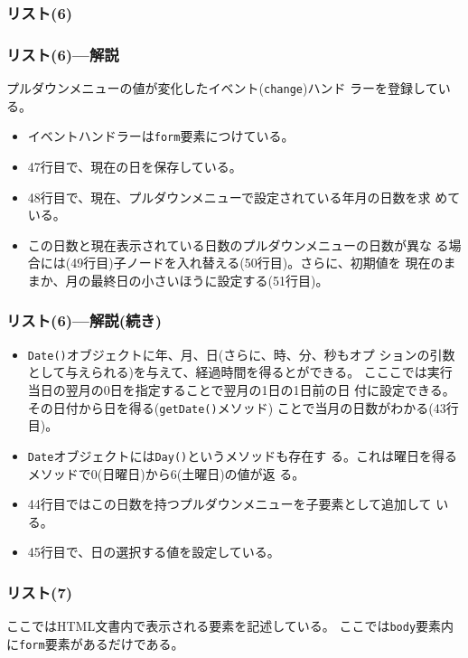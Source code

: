 \begin{frame}[containsverbatim]
\frametitle{リスト(6)}
\end{frame}
\begin{frame}[containsverbatim]
\frametitle{リスト(6)---解説}
プルダウンメニューの値が変化したイベント(\texttt{change})ハンド
 ラーを登録している。
\begin{itemize}
 \item イベントハンドラーは\texttt{form}要素につけている。
 \item 47行目で、現在の日を保存している。
 \item 48行目で、現在、プルダウンメニューで設定されている年月の日数を求
       めている。
 \item この日数と現在表示されている日数のプルダウンメニューの日数が異な
       る場合には(49行目)子ノードを入れ替える(50行目)。さらに、初期値を
       現在のままか、月の最終日の小さいほうに設定する(51行目)。
\end{itemize}
\end{frame}
\begin{frame}[containsverbatim]
\frametitle{リスト(6)---解説(続き)}
\begin{itemize}
 \item \texttt{Date()}オブジェクトに年、月、日(さらに、時、分、秒もオプ
       ションの引数として与えられる)を与えて、経過時間を得るとができる。
       こここでは実行当日の翌月の0日を指定することで翌月の1日の1日前の日
       付に設定できる。その日付から日を得る(\texttt{getDate()}メソッド)
       ことで当月の日数がわかる(43行目)。
 \item \texttt{Date}オブジェクトには\texttt{Day()}というメソッドも存在す
       る。これは曜日を得るメソッドで$0$(日曜日)から$6$(土曜日)の値が返
       る。
 \item 44行目ではこの日数を持つプルダウンメニューを子要素として追加して
       いる。
 \item 45行目で、日の選択する値を設定している。
\end{itemize}
\end{frame}
\begin{frame}[containsverbatim]
\frametitle{リスト(7)}
ここではHTML文書内で表示される要素を記述している。
ここでは\texttt{body}要素内に\texttt{form}要素があるだけである。
\end{frame}

